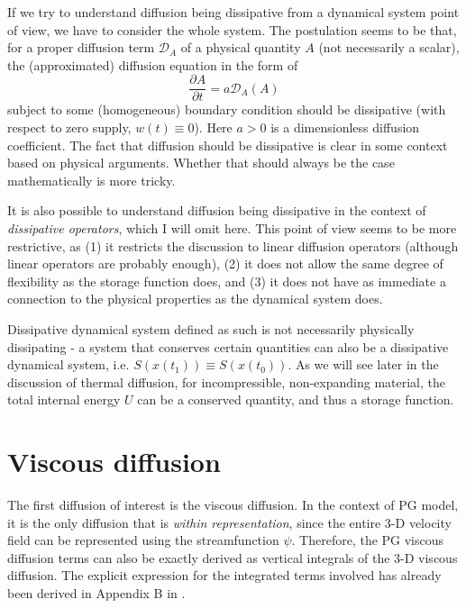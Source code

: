 If we try to understand diffusion being dissipative from a dynamical system point of view, we have to consider the whole system. The postulation seems to be that, for a proper diffusion term $\mathcal{D}_A$ of a physical quantity $A$ (not necessarily a scalar), the (approximated) diffusion equation in the form of
\[
    \frac{\partial A}{\partial t} = a\mathcal{D}_A (A)
\]
subject to some (homogeneous) boundary condition should be dissipative (with respect to zero supply, $w(t) \equiv 0$). Here $a > 0$ is a dimensionless diffusion coefficient. The fact that diffusion should be dissipative is clear in some context based on physical arguments. Whether that should always be the case mathematically is more tricky. 

It is also possible to understand diffusion being dissipative in the context of \textit{dissipative operators}, which I will omit here. This point of view seems to be more restrictive, as (1) it restricts the discussion to linear diffusion operators (although linear operators are probably enough), (2) it does not allow the same degree of flexibility as the storage function does, and (3) it does not have as immediate a connection to the physical properties as the dynamical system does.

Dissipative dynamical system defined as such is not necessarily physically dissipating - a system that conserves certain quantities can also be a dissipative dynamical system, i.e. $S(x(t_1)) \equiv S(x(t_0))$. As we will see later in the discussion of thermal diffusion, for incompressible, non-expanding material, the total internal energy $U$ can be a conserved quantity, and thus a storage function.


\section{Viscous diffusion}

The first diffusion of interest is the viscous diffusion. In the context of PG model, it is the only diffusion that is \textit{within representation}, since the entire 3-D velocity field can be represented using the streamfunction $\psi$.
Therefore, the PG viscous diffusion terms can also be exactly derived as vertical integrals of the 3-D viscous diffusion. The explicit expression for the integrated terms involved has already been derived in Appendix B in \textcite{jackson_plesio-geostrophy_2020}.

